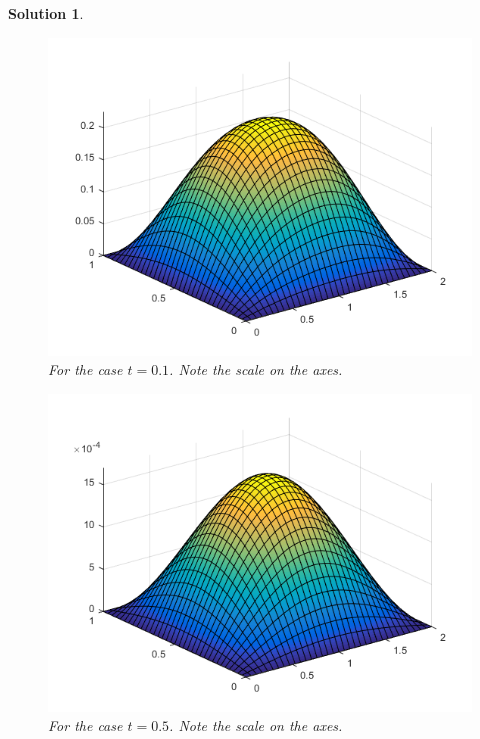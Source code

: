 \documentclass[leqno]{article}
\theoremstyle{nonumberplain}
\newtheorem{solution}{Solution}
\begin{document}
\begin{solution}
\pagebreak

\begin{figure}[h]
    \centering
    \includegraphics{problem_2_t=01_hw_5.png}
    \caption{For the case $t=0.1$. Note the scale on the axes.}
    \label{fig:my_label}
\end{figure}

\pagebreak

\begin{figure}[h]
    \centering
    \includegraphics{problem_2_t=05_hw_5.png}
    \caption{For the case $t=0.5$. Note the scale on the axes.}
    \label{fig:my_label}
\end{figure}

\pagebreak


\end{solution}
\end{document}
